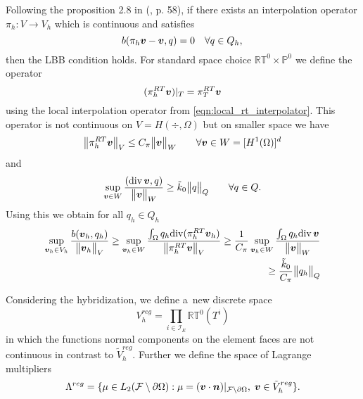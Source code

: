 Following the proposition 2.8 in (\cite{brezzi_mixed_1991}, p. 58),
if there exists an interpolation operator
$\pi_h: V\rightarrow V_h$ which is continuous and satisfies
\begin{equation}
    b(\pi_h\mathbf{\boldsymbol{v}}- \mathbf{\boldsymbol{v}}, q) = 0 \quad \forall q\in Q_h,\\ 
\end{equation}
then the LBB condition holds.
For standard space choice $\mathbb{RT}^0\times\mathbb{P}^0$ we define
the operator 
\begin{equation}
    (\pi^{RT}_h \mathbf{\boldsymbol{v}})|_T = \pi^{RT}_T \mathbf{\boldsymbol{v}}
\end{equation}
using the local interpolation operator from \eqref{eqn:local_rt_interpolator}.
This operator is not continuous on $V=H(\div,\Omega)$ but on
smaller space we have
\begin{equation}
    \bigl\Vert\pi^{RT}_h \mathbf{\boldsymbol{v}}\bigr\Vert_V \leq C_\pi \bigl\Vert\mathbf{\boldsymbol{v}}\bigr\Vert_W \qquad \forall \mathbf{\boldsymbol{v}}\in W=[H^1(\Omega)]^d
\end{equation}
and
\begin{equation}
    \sup_{\mathbf{\boldsymbol{v}}\in W} \frac{({\rm div}\,\mathbf{\boldsymbol{v}}, q)}{\bigl\Vert\mathbf{\boldsymbol{v}}\bigr\Vert_W} \geq \tilde{k}_0 \bigl\Vert q\bigr\Vert_Q \qquad \forall q\in Q.
\end{equation}
Using this we obtain for all $q_h\in Q_h$
\begin{align}
    \sup_{\mathbf{\boldsymbol{v}}_h\in V_h} \frac{b(\mathbf{\boldsymbol{v}}_h,q_h)}{\bigl\Vert\mathbf{\boldsymbol{v}}_h\bigr\Vert_V} \geq
    \sup_{\mathbf{\boldsymbol{v}}_h\in W} \frac{\int_{\Omega} q_h {\rm div} (\pi^{RT}_h \mathbf{\boldsymbol{v}}_h)}{\bigl\Vert\pi^{RT}_h \mathbf{\boldsymbol{v}}\bigr\Vert_V} \geq
    \frac{1}{C_\pi} \sup_{\mathbf{\boldsymbol{v}}_h\in W} \frac{\int_{\Omega} q_h {\rm div}\,\mathbf{\boldsymbol{v}}}{\bigl\Vert\mathbf{\boldsymbol{v}}\bigr\Vert_W}
    \nonumber\\ \geq \frac{\tilde{k}_0}{C_\pi}\bigl\Vert q_h\bigr\Vert_Q
\end{align}




Considering the hybridization, we define a~new discrete space
\begin{equation}
    V_h^{reg} = \prod\limits_{i\in\mathcal{I}_E} \mathbb{RT}^0(T^i)
\end{equation}
in which the functions normal components on the element faces are not continuous
in contrast to $\tilde V_h^{reg}$.
Further we define the space of Lagrange multipliers
\begin{equation}
    \Lambda^{reg} = \{\mu\in L_2(\mathcal{F}\setminus\partial\Omega): \mu=(\mathbf{\boldsymbol{v}}\cdot\mathbf{\boldsymbol{n}})|_{\mathcal{F}\setminus\partial\Omega},\; \mathbf{\boldsymbol{v}}\in \tilde V_h^{reg}\}.
\end{equation}

